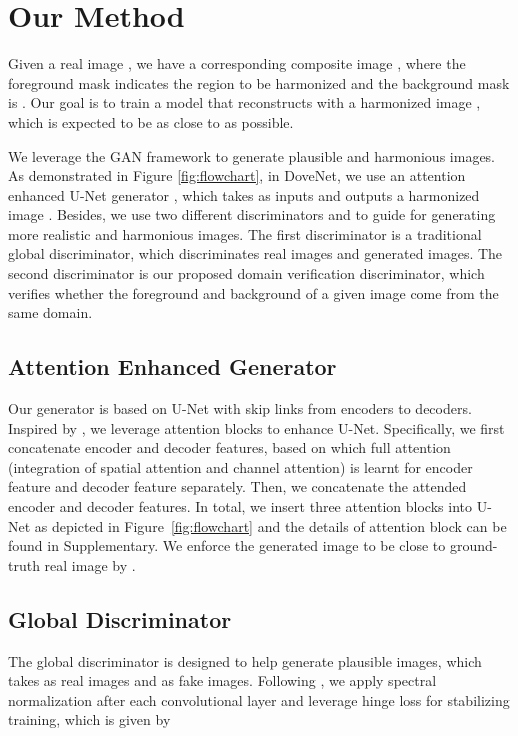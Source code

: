 \documentclass[10pt,twocolumn,letterpaper]{article}
\begin{document}
\section{Our Method}
Given a real image , we have a corresponding composite image , where the foreground mask  indicates the region to be harmonized and the background mask is . Our goal is to train a model that reconstructs  with a harmonized image , which is expected to be as close to  as possible.

We leverage the GAN \cite{goodfellow2014generative} framework to generate plausible and harmonious images. As demonstrated in Figure \ref{fig:flowchart}, in DoveNet, we use an attention enhanced U-Net generator , which takes  as inputs and outputs a harmonized image . Besides, we use two different discriminators  and  to guide  for generating more realistic and harmonious images. The first discriminator  is a traditional global discriminator, which discriminates real images and generated images. The second discriminator  is our proposed domain verification discriminator, which verifies whether the foreground and background of a given image come from the same domain. 

\subsection{Attention Enhanced Generator}
Our generator  is based on U-Net \cite{ronneberger2015u} with skip links from encoders to decoders. Inspired by \cite{xiaodong2019improving}, we leverage attention blocks to enhance U-Net. Specifically, we first concatenate encoder and decoder features, based on which full attention~\cite{yu2019free} (integration of spatial attention and channel attention) is learnt for encoder feature and decoder feature separately. Then, we concatenate the attended encoder and decoder features. In total, we insert three attention blocks into U-Net as depicted in Figure~\ref{fig:flowchart} and the details of attention block can be found in Supplementary.
We enforce the generated image  to be close to ground-truth real image  by .


\subsection{Global Discriminator}
The global discriminator  is designed to help  generate plausible images, which takes  as real images and  as fake images. Following \cite{miyato2018spectral}, we apply spectral normalization after each convolutional layer and leverage hinge loss for stabilizing training, which is given by
\end{document}
